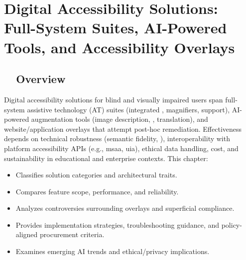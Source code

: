 \chapter{Digital Accessibility Solutions: Full-System Suites, AI-Powered Tools, and Accessibility Overlays}
\label{chap:accessibility-solutions}

\section{~~Overview}
\label{sec:ch28-overview}
Digital accessibility solutions for blind and visually impaired users span full-system assistive technology (AT) suites (integrated , magnifiers,  support), AI-powered augmentation tools (image description, , translation), and website/application overlays that attempt post-hoc remediation. Effectiveness depends on technical robustness (semantic fidelity, ), interoperability with platform accessibility APIs (e.g., \gls{msaa}, \gls{uia}), ethical data handling, cost, and sustainability in educational and enterprise contexts. This chapter:
\begin{itemize}
	\item Classifies solution categories and architectural traits.
	\item Compares feature scope, performance, and reliability.
	\item Analyzes controversies surrounding overlays and superficial compliance.
	\item Provides implementation strategies, troubleshooting guidance, and policy-aligned procurement criteria.
	\item Examines emerging AI trends and ethical/privacy implications.
\end{itemize}

